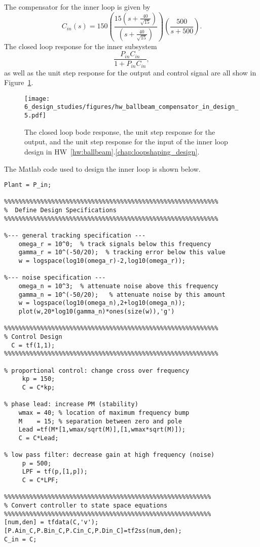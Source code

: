 The compensator for the inner loop is given by
\[
C_{in}(s) = 150 \left(\frac{15(s+\frac{40}{\sqrt{15}})}{(s+\frac{40}{\sqrt{15}})}\right)\left(\frac{500}{s+500}\right).
\]
The closed loop response for the inner subsystem
\[
\frac{P_{in}C_{in}}{1+P_{in}C_{in}},
\] 
as well as the unit step response for the output and control signal are all show in Figure~\ref{fig:hw_ballbeam_compensator_in_design_5}.
\begin{figure}[H]
   \centering
   \texttt{[image: 6\_design\_studies/figures/hw\_ballbeam\_compensator\_in\_design\_5.pdf]}
   \caption{The closed loop bode response, the unit step response for the output, and the unit step response for the input of the inner loop design in HW~\ref{hw:ballbeam}.\ref{chap:loopshaping_design}.}
   \label{fig:hw_ballbeam_compensator_in_design_5}
\end{figure}

The Matlab code used to design the inner loop is shown below.
\begin{lstlisting}
Plant = P_in;

%%%%%%%%%%%%%%%%%%%%%%%%%%%%%%%%%%%%%%%%%%%%%%%%%%%%%%%%%%%
%  Define Design Specifications
%%%%%%%%%%%%%%%%%%%%%%%%%%%%%%%%%%%%%%%%%%%%%%%%%%%%%%%%%%%

%--- general tracking specification ---
    omega_r = 10^0;  % track signals below this frequency
    gamma_r = 10^(-50/20);  % tracking error below this value
    w = logspace(log10(omega_r)-2,log10(omega_r));

%--- noise specification ---
    omega_n = 10^3;  % attenuate noise above this frequency
    gamma_n = 10^(-50/20);   % attenuate noise by this amount
    w = logspace(log10(omega_n),2+log10(omega_n));
    plot(w,20*log10(gamma_n)*ones(size(w)),'g')
        
%%%%%%%%%%%%%%%%%%%%%%%%%%%%%%%%%%%%%%%%%%%%%%%%%%%%%%%%%%%
% Control Design
  C = tf(1,1);
%%%%%%%%%%%%%%%%%%%%%%%%%%%%%%%%%%%%%%%%%%%%%%%%%%%%%%%%%%%

% proportional control: change cross over frequency
     kp = 150;
     C = C*kp;
     
% phase lead: increase PM (stability)
    wmax = 40; % location of maximum frequency bump
    M    = 15; % separation between zero and pole
    Lead =tf(M*[1,wmax/sqrt(M)],[1,wmax*sqrt(M)]);
    C = C*Lead;
    
% low pass filter: decrease gain at high frequency (noise)
     p = 500;
     LPF = tf(p,[1,p]);
     C = C*LPF;
       
%%%%%%%%%%%%%%%%%%%%%%%%%%%%%%%%%%%%%%%%%%%%%%%%%%%%%%%%%
% Convert controller to state space equations 
%%%%%%%%%%%%%%%%%%%%%%%%%%%%%%%%%%%%%%%%%%%%%%%%%%%%%%%%%
[num,den] = tfdata(C,'v');
[P.Ain_C,P.Bin_C,P.Cin_C,P.Din_C]=tf2ss(num,den);
C_in = C;
\end{lstlisting}


